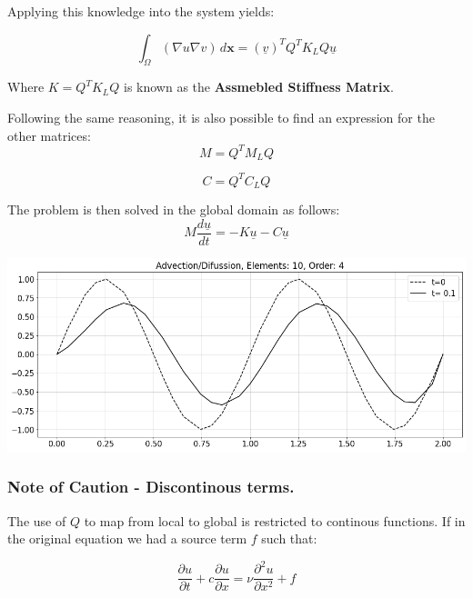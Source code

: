 \documentclass[
  a4paper,
  10pt]{article}
\begin{document}
Applying this knowledge into the system yields:

\begin{equation}
        \int_{\Omega} (\nabla u \nabla v) \,d\textbf{x} = (\underline{v})^{T}Q^{T}K_LQ\underline{u}    
\end{equation}

Where \(K=Q^{T}K_LQ\) is known as the \textbf{Assmebled Stiffness
Matrix}.

Following the same reasoning, it is also possible to find an expression
for the other matrices: \begin{equation}
M = Q^{T}M_LQ    
\end{equation}

\begin{equation}
C = Q^{T}C_LQ    
\end{equation}

The problem is then solved in the global domain as follows:
\begin{equation}
M\frac{d\underline{u}}{dt}=-K\underline{u}-C\underline{u}
\end{equation}

\includegraphics{figs/da09c33b2e35ea401b49fefd07523c278274758d.png}

\hypertarget{note-of-caution---discontinous-terms.}{%
\subsubsection{Note of Caution - Discontinous
terms.}\label{note-of-caution---discontinous-terms.}}

The use of \(Q\) to map from local to global is restricted to continous
functions. If in the original equation we had a source term \(f\) such
that:

\begin{equation}
\frac{\partial{u}}{\partial{t}} + c \frac{\partial{u}}{\partial{x}} =  \nu \frac{\partial^{2}u}{\partial{x}^{2}}+f
\end{equation}
\end{document}
